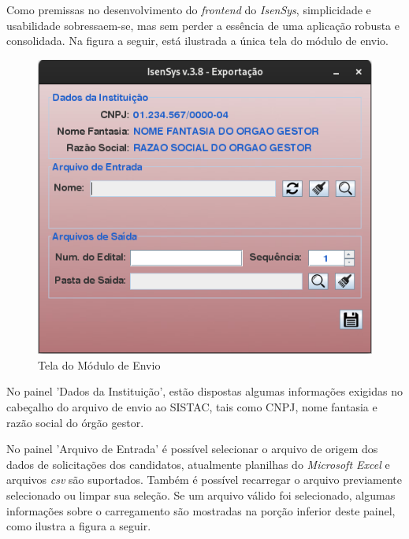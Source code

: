\documentclass[
	12pt,			%
	openright,		%
	oneside,	
	a4paper,		%
	english,		%
	brazil			%
]{abntex2/abntex2}  %
\begin{document}
				Como premissas no desenvolvimento do \textit{frontend} do \textit{IsenSys}, simplicidade e usabilidade sobressaem-se, mas sem perder a essência de uma aplicação robusta e consolidada. Na figura a seguir, está ilustrada a única tela do módulo de envio.
	
				\begin{figure}[h]
					\begin{center}
						
						\caption{Tela do Módulo de Envio}
						\label{envio-ui}
						
						\includegraphics[scale=0.6]{img/envio-ui}
						
					\end{center}
				\end{figure}
	
				No painel 'Dados da Instituição', estão dispostas algumas informações exigidas no cabeçalho do arquivo de envio ao SISTAC, tais como CNPJ, nome fantasia e razão social do órgão gestor.
	
				No painel 'Arquivo de Entrada' é possível selecionar o arquivo de origem dos dados de solicitações dos candidatos, atualmente planilhas do \textit{Microsoft Excel} e arquivos \textit{csv} são suportados. Também é possível recarregar o arquivo previamente selecionado ou limpar sua seleção. Se um arquivo válido foi selecionado, algumas informações sobre o carregamento são mostradas na porção inferior deste painel, como ilustra a figura a seguir.
	
\end{document}
